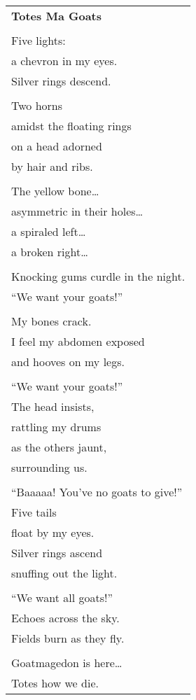 \documentclass{article}
\begin{document}
\begin{center}
\begin{tabular}{l}
\textbf{Totes Ma Goats} \\
\\
Five lights: \\
a chevron in my eyes. \\
Silver rings descend. \\
\\
Two horns \\
amidst the floating rings \\
on a head adorned \\
by hair and ribs. \\
\\
The yellow bone\ldots \\
asymmetric in their holes\ldots \\
a spiraled left\ldots \\
a broken right\ldots \\
\\
Knocking gums curdle in the night. \\
``We want your goats!'' \\
\\
My bones crack. \\
I feel my abdomen exposed \\
and hooves on my legs. \\
\\
``We want your goats!'' \\
The head insists, \\
rattling my drums \\
as the others jaunt, \\
surrounding us. \\
\\
``Baaaaa!  You've no goats to give!''
\\
Five tails \\
float by my eyes. \\
Silver rings ascend \\
snuffing out the light. \\
\\
``We want all goats!'' \\
Echoes across the sky. \\
Fields burn as they fly. \\
\\
Goatmagedon is here\ldots \\
Totes how we die. \\
\end{tabular}
\end{center}
\end{document}
